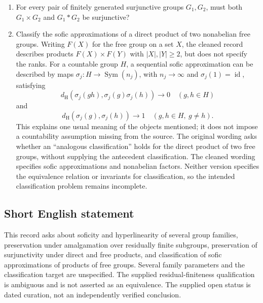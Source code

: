 \documentclass[11pt]{article}
\begin{document}
\begin{enumerate}
\item For every pair of finitely generated surjunctive groups \(G_1,G_2\), must both \(G_1\times G_2\) and \(G_1*G_2\) be surjunctive?

\item Classify the sofic approximations of a direct product of two nonabelian free groups. Writing \(F(X)\) for the free group on a set \(X\), the cleaned record describes products \(F(X)\times F(Y)\) with \(|X|,|Y|\geq2\), but does not specify the ranks. For a countable group \(H\), a sequential sofic approximation can be described by maps \(\sigma_j:H\to\operatorname{Sym}(n_j)\), with \(n_j\to\infty\) and \(\sigma_j(1)=\operatorname{id}\), satisfying
\[
 d_{\mathrm H}(\sigma_j(gh),\sigma_j(g)\sigma_j(h))\longrightarrow0
 \quad(g,h\in H)
\]
and
\[
 d_{\mathrm H}(\sigma_j(g),\sigma_j(h))\longrightarrow1
 \quad(g,h\in H,\ g\ne h).
\]
This explains one usual meaning of the objects mentioned; it does not impose a countability assumption missing from the source. The original wording asks whether an ``analogous classification'' holds for the direct product of two free groups, without supplying the antecedent classification. The cleaned wording specifies sofic approximations and nonabelian factors. Neither version specifies the equivalence relation or invariants for classification, so the intended classification problem remains incomplete.
\end{enumerate}
\subsection{Short English statement}
This record asks about soficity and hyperlinearity of several group families, preservation under amalgamation over residually finite subgroups, preservation of surjunctivity under direct and free products, and classification of sofic approximations of products of free groups. Several family parameters and the classification target are unspecified. The supplied residual-finiteness qualification is ambiguous and is not asserted as an equivalence. The supplied open status is dated curation, not an independently verified conclusion.
\end{document}
